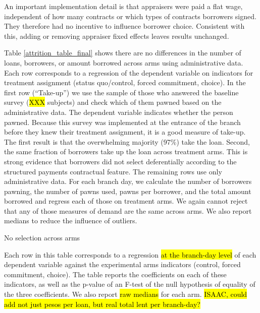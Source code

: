 \documentclass[12pt, a4paper]{article}
\begin{document}
An important implementation detail is that appraisers were paid a flat wage, independent of how many contracts or which types of contracts borrowers signed. They therefore had no incentive to influence borrower choice. Consistent with this, adding or removing appraiser fixed effects leaves results unchanged. 

Table \ref{attrition_table_final} shows there are no differences in the number of loans, borrowers, or amount borrowed across arms using administrative data. Each row corresponds to a regression of the dependent variable on indicators for treatment assignment (status quo/control, forced commitment, choice). In the first row (``Take-up'') we use the sample of those who answered the baseline survey (\hl{XXX} subjects) and check which of them pawned based on the administrative data. The dependent variable indicates whether the person pawned. Because this survey was implemented at the entrance of the branch before they knew their treatment assignment, it is a good measure of take-up. The first result is that the overwhelming majority (97\%) take the loan. Second, the same fraction of borrowers take up the loan across treatment arms. This is strong evidence that borrowers did not select deferentially according to the structured payments contractual feature. The remaining rows use only administrative data. For each branch day, we calculate the number of borrowers pawning, the number of pawns used, pawns per borrower, and the total amount borrowed and regress each of those on treatment arms. We again cannot reject that any of those measures of demand are the same across arms.  We also report medians to reduce the influence of outliers. 


\begin{table}[H]
\caption{No selection across arms}
\label{attrition_table_final}
\begin{center}
\footnotesize{}
\end{center}
\scriptsize{Each row in this table 
 corresponds to a regression \hl{at the branch-day level} of each dependent variable against the experimental arms indicators (control, forced commitment, choice). The table reports the coefficients on each of these indicators, as well as the p-value of an F-test of the null hypothesis of equality of the three coefficients. We also report \hl{raw medians} for each arm. \hl{ISAAC, could add not just pesos per loan, but real total lent per branch-day?} %
 }
\end{table}
\end{document}
